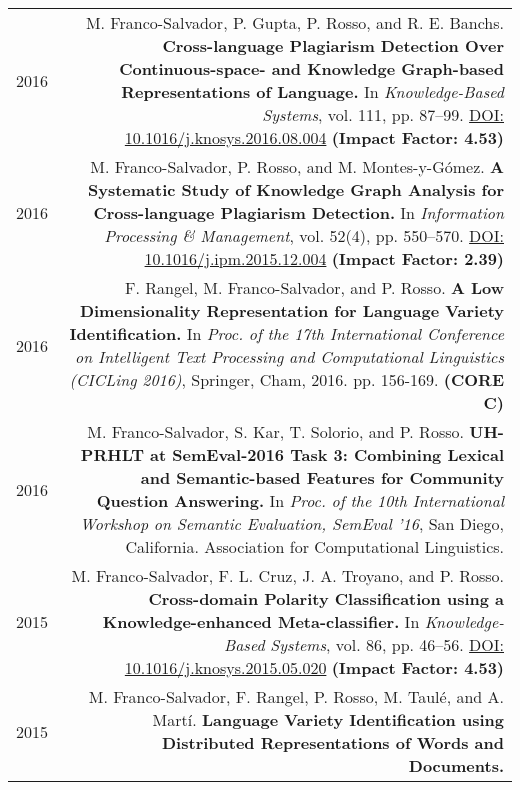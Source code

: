 \documentclass[10pt]{article}
\begin{document}
\section*{}
\begin{tabular}{L!{\VRule}R}
    2016&M. Franco-Salvador, P. Gupta, P. Rosso, and R. E. Banchs. \textbf{Cross-language Plagiarism Detection Over Continuous-space- and Knowledge Graph-based Representations of Language.}
	In \emph{Knowledge-Based Systems}, vol. 111, pp. 87--99. \href{http://dx.doi.org/10.1016/j.knosys.2016.08.004}{DOI: 10.1016/j.knosys.2016.08.004} \textbf{(Impact Factor: 4.53)} \vspace{5pt}\\
	2016&M. Franco-Salvador, P. Rosso, and M. Montes-y-G{\'o}mez. \textbf{A Systematic Study of Knowledge Graph Analysis for Cross-language Plagiarism Detection.}
	In \emph{Information Processing \& Management}, vol. 52(4), pp. 550--570. \href{http://dx.doi.org/10.1016/j.ipm.2015.12.004}{DOI: 10.1016/j.ipm.2015.12.004} \textbf{(Impact Factor: 2.39)} \vspace{5pt}\\
	2016 &F. Rangel, M. Franco-Salvador, and P. Rosso. \textbf{A Low Dimensionality Representation for Language Variety Identification.} In \emph{Proc.  of  the  17th  International Conference on Intelligent Text Processing and Computational Linguistics (CICLing 2016)}, Springer, Cham, 2016. pp. 156-169. \textbf{(CORE C)} \vspace{5pt}\\
	2016 &M. Franco-Salvador, S. Kar, T. Solorio, and P. Rosso. \textbf{UH-PRHLT at SemEval-2016 Task 3: Combining Lexical and Semantic-based Features for Community Question Answering.} In \emph{Proc. of the 10th International Workshop on Semantic Evaluation, SemEval '16}, San Diego, California. Association for Computational Linguistics. \vspace{5pt}\\
    2015&M. Franco-Salvador, F. L. Cruz, J. A. Troyano, and P. Rosso. \textbf{Cross-domain Polarity Classification using a Knowledge-enhanced Meta-classifier.}	
	In \emph{Knowledge-Based Systems}, vol. 86, pp. 46--56. \href{http://dx.doi.org/10.1016/j.knosys.2015.05.020}{DOI: 10.1016/j.knosys.2015.05.020} \textbf{(Impact Factor: 4.53)} \vspace{5pt}\\
	2015&M. Franco-Salvador, F. Rangel, P. Rosso, M. Taul{\'e}, and A. Mart{\'i}. \textbf{Language Variety Identification using Distributed Representations of Words and Documents.}

\end{tabular}
\end{document}

